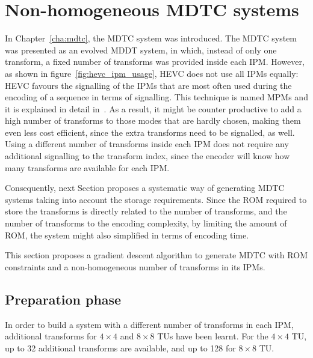 \documentclass[11pt,a4paper,openright,twoside]{book}
\numberwithin{equation}{section} %
\numberwithin{figure}{section} %
\numberwithin{table}{section} %
\begin{document}
\section{Non-homogeneous \acs{MDTC} systems}
\label{sec:non_homogeneous_mdtc_systems}

In Chapter~\ref{cha:mdtc}, the \ac{MDTC} system was introduced.
The \ac{MDTC} system was presented as an evolved \ac{MDDT} system, in which,
instead of only one transform, a fixed number of transforms was provided
inside each \ac{IPM}.
However, as shown in figure~\ref{fig:hevc_ipm_usage}, \ac{HEVC} does not use
all \acp{IPM} equally:
\ac{HEVC} favours the signalling of the \acp{IPM} that are most often used
during the encoding of a sequence in terms of signalling.
This technique is named \acp{MPM} and it is explained in detail
in~\cite{wien-15-hevc}.
As a result, it might be counter productive to add a high number of transforms
to those modes that are hardly chosen, making them even less cost efficient,
since the extra transforms need to be signalled, as well.
Using a different number of transforms inside each \ac{IPM} does not require
any additional signalling to the transform index, since the encoder will know
how many transforms are available for each \ac{IPM}.

Consequently, next Section proposes a systematic way of generating \ac{MDTC}
systems taking into account the storage requirements.
Since the \acs{ROM} required to store the transforms is directly related to
the number of transforms, and the number of transforms to the encoding
complexity, by limiting the amount of \acs{ROM}, the system might also
simplified in terms of encoding time.

This section proposes a gradient descent algorithm to generate \ac{MDTC} with
\acs{ROM} constraints and a non-homogeneous number of transforms in its
\acp{IPM}.

\subsection{Preparation phase}
\label{sub:rw_preparation_phase}

In order to build a system with a different number of transforms in each
\ac{IPM}, additional transforms for $4\times4$ and $8\times8$ \acp{TU} have
been learnt.
For the $4\times4$ \ac{TU}, up to 32 additional transforms are available, and
up to 128 for $8\times8$ \ac{TU}.
\end{document}
